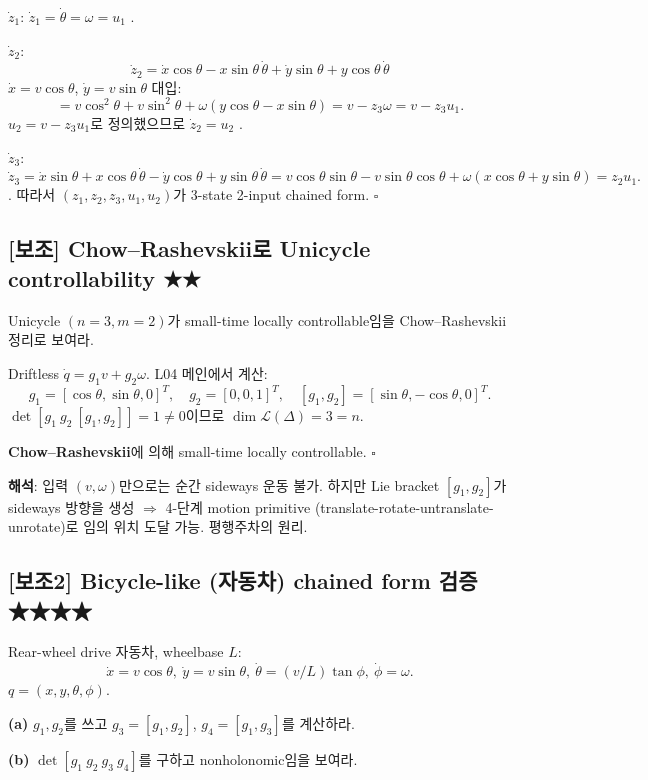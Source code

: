 \documentclass[11pt,a4paper]{article}
\begin{document}
\begin{sol}
\textbf{$\dot z_1$}: $\dot z_1 = \dot\theta = \omega = u_1$ \checkmark.

\textbf{$\dot z_2$}:
\[
\dot z_2 = \dot x\cos\theta - x\sin\theta\,\dot\theta + \dot y\sin\theta + y\cos\theta\,\dot\theta
\]
$\dot x = v\cos\theta$, $\dot y = v\sin\theta$ 대입:
\[
= v\cos^2\theta + v\sin^2\theta + \omega(y\cos\theta - x\sin\theta) = v - z_3\omega = v - z_3 u_1.
\]
$u_2 = v - z_3 u_1$로 정의했으므로 $\dot z_2 = u_2$ \checkmark.

\textbf{$\dot z_3$}:
\[
\dot z_3 = \dot x\sin\theta + x\cos\theta\,\dot\theta - \dot y\cos\theta + y\sin\theta\,\dot\theta = v\cos\theta\sin\theta - v\sin\theta\cos\theta + \omega(x\cos\theta + y\sin\theta) = z_2 u_1.
\]
\checkmark. 따라서 $(z_1, z_2, z_3, u_1, u_2)$가 3-state 2-input chained form. \hfill$\square$
\end{sol}

\subsection*{[보조] Chow--Rashevskii로 Unicycle controllability \hfill ★★}

\begin{prob}
Unicycle $(n = 3, m = 2)$가 small-time locally controllable임을 Chow--Rashevskii 정리로 보여라.
\end{prob}

\begin{sol}
Driftless $\dot q = g_1 v + g_2 \omega$. L04 메인에서 계산:
\[
g_1 = [\cos\theta, \sin\theta, 0]^T,\quad g_2 = [0, 0, 1]^T,\quad [g_1, g_2] = [\sin\theta, -\cos\theta, 0]^T.
\]
$\det[g_1\ g_2\ [g_1, g_2]] = 1 \neq 0$이므로 $\dim \mathcal{L}(\Delta) = 3 = n$.

\textbf{Chow--Rashevskii}에 의해 small-time locally controllable. \hfill$\square$

\textbf{해석}: 입력 $(v, \omega)$만으로는 순간 sideways 운동 불가. 하지만 Lie bracket $[g_1, g_2]$가 sideways 방향을 생성 $\Rightarrow$ 4-단계 motion primitive (translate-rotate-untranslate-unrotate)로 임의 위치 도달 가능. 평행주차의 원리.
\end{sol}

\subsection*{[보조2] Bicycle-like (자동차) chained form 검증 \hfill ★★★★}

\begin{prob}
Rear-wheel drive 자동차, wheelbase $L$:
\[\dot x = v\cos\theta,\ \dot y = v\sin\theta,\ \dot\theta = (v/L)\tan\phi,\ \dot\phi = \omega.\]
$q = (x, y, \theta, \phi)$.

\textbf{(a)} $g_1, g_2$를 쓰고 $g_3 = [g_1, g_2]$, $g_4 = [g_1, g_3]$를 계산하라.

\textbf{(b)} $\det[g_1\ g_2\ g_3\ g_4]$를 구하고 nonholonomic임을 보여라.
\end{prob}
\end{document}
